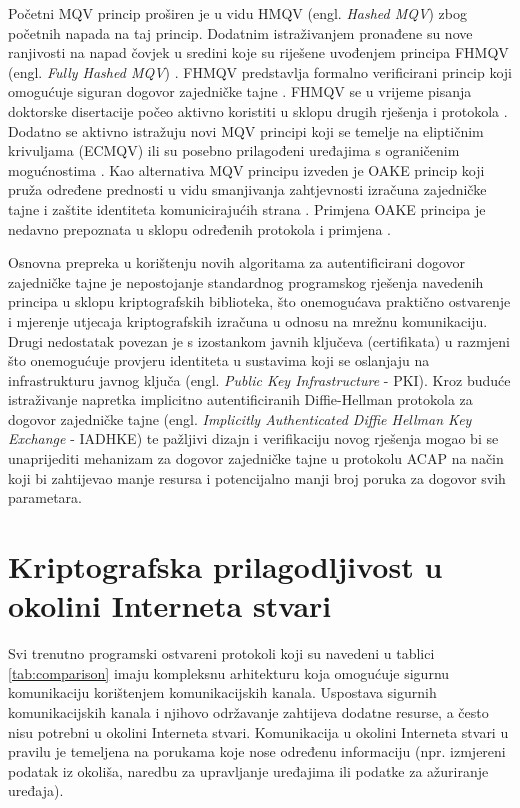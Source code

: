 Početni MQV princip proširen je u vidu HMQV (engl. \emph{Hashed MQV})
\cite{krawczyk2005hmqv} zbog početnih napada na taj princip. Dodatnim
istraživanjem pronađene su nove ranjivosti na napad čovjek u sredini koje su
riješene uvođenjem principa FHMQV (engl. \emph{Fully Hashed MQV})
\cite{sarr2010secure}. FHMQV predstavlja formalno verificirani princip koji
omogućuje siguran dogovor zajedničke tajne \cite{liu2014security}. FHMQV se u
vrijeme pisanja doktorske disertacije počeo aktivno koristiti u sklopu drugih
rješenja i protokola \cite{gruber2014concept} \cite{barenghi2014snake}. Dodatno
se aktivno istražuju novi MQV principi koji se temelje na eliptičnim krivuljama
(ECMQV) ili su posebno prilagođeni uređajima s ograničenim mogućnostima
\cite{zhao2015shmqv}.
Kao alternativa MQV principu izveden je OAKE princip koji pruža određene
prednosti u vidu smanjivanja zahtjevnosti izračuna zajedničke tajne i zaštite
identiteta komunicirajućih strana \cite{yao2013oake}. Primjena OAKE principa je
nedavno prepoznata u sklopu određenih protokola i primjena
\cite{dagdelen2013cryptographic}.

Osnovna prepreka u korištenju novih algoritama za autentificirani dogovor
zajedničke tajne je nepostojanje standardnog programskog rješenja navedenih
principa u
sklopu kriptografskih biblioteka, što onemogućava praktično ostvarenje i
mjerenje utjecaja kriptografskih izračuna u odnosu na mrežnu komunikaciju. Drugi
nedostatak povezan je s izostankom javnih ključeva (certifikata) u
razmjeni što onemogućuje provjeru identiteta u sustavima koji se oslanjaju na
infrastrukturu javnog ključa (engl. \emph{Public Key Infrastructure} - PKI).
Kroz buduće istraživanje napretka implicitno autentificiranih Diffie-Hellman
protokola za dogovor zajedničke tajne (engl. \emph{Implicitly Authenticated
Diffie Hellman Key Exchange} - IADHKE) te pažljivi dizajn i verifikaciju novog
rješenja mogao bi se unaprijediti mehanizam za dogovor zajedničke tajne u
protokolu ACAP na način koji bi zahtijevao manje resursa i potencijalno manji
broj poruka za dogovor svih parametara.


\section{Kriptografska prilagodljivost u okolini Interneta stvari}

Svi trenutno programski ostvareni protokoli koji su navedeni u tablici
\ref{tab:comparison} imaju kompleksnu arhitekturu koja omogućuje sigurnu
komunikaciju korištenjem komunikacijskih kanala. Uspostava sigurnih
komunikacijskih kanala i njihovo održavanje zahtijeva dodatne resurse, a često
nisu potrebni u okolini Interneta stvari. Komunikacija u okolini Interneta
stvari u pravilu je temeljena na porukama koje nose određenu informaciju
(npr. izmjereni podatak iz okoliša, naredbu za upravljanje uređajima ili
podatke za ažuriranje uređaja).

